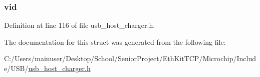 \subsubsection[{vid}]{ vid}\label{struct_u_s_b___c_h_a_r_g_i_n_g___d_e_v_i_c_e___i_d_a9fcc011b7b6427b55322964f2d01781f}


Definition at line 116 of file usb\+\_\+host\+\_\+charger.\+h.



The documentation for this struct was generated from the following file\+:\begin{DoxyCompactItemize}
\item 
C\+:/\+Users/mainuser/\+Desktop/\+School/\+Senior\+Project/\+Eth\+Kit\+T\+C\+P/\+Microchip/\+Include/\+U\+S\+B/\hyperlink{usb__host__charger_8h}{usb\+\_\+host\+\_\+charger.\+h}\end{DoxyCompactItemize}
